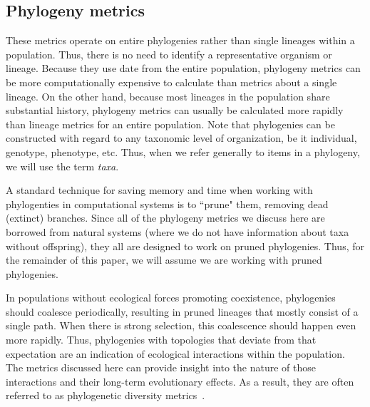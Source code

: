 \documentclass[letterpaper]{article}
\begin{document}
\subsection{Phylogeny metrics}

These metrics operate on entire phylogenies rather than single lineages within a population.
Thus, there is no need to identify a representative organism or lineage.
Because they %
use date from
the entire population, phylogeny metrics can be more computationally expensive to calculate than metrics about a single lineage. On the other hand, because most lineages in the population share substantial history, phylogeny metrics can usually be calculated more rapidly than lineage metrics %
for an entire population. Note that phylogenies can be constructed with regard to any taxonomic level of organization, be it individual, genotype, phenotype, etc. Thus, when we refer generally to items in a phylogeny, we will use the term \textit{taxa}.

A standard technique for saving memory and time when working with phylogenties in computational systems is to ``prune" them, removing 
dead (extinct) branches.
Since all of the phylogeny metrics we discuss here are borrowed from natural systems (where we do not have information about taxa without offspring), they all are designed to work on pruned phylogenies. Thus, for the remainder of this paper, we will assume we are working with pruned phylogenies.

In populations without ecological forces promoting coexistence, phylogenies should coalesce periodically, resulting in pruned lineages that mostly consist of a single path. When there is strong selection, this coalescence should happen even more rapidly. Thus, phylogenies with topologies that deviate from that expectation are an indication of ecological interactions within the population. The metrics discussed here can provide insight into the nature of those interactions and their long-term evolutionary effects. As a result, they are often referred to as phylogenetic diversity metrics~\citep{tucker_guide_2017}.
\end{document}
